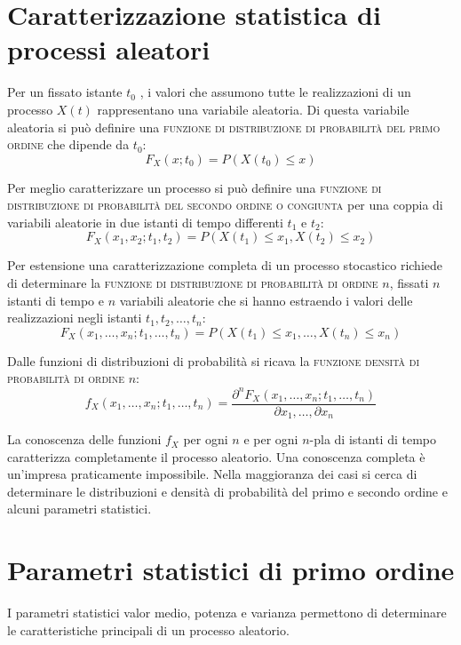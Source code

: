 \section{Caratterizzazione statistica di processi aleatori}
Per un fissato istante $t_0$ , i valori che assumono tutte le realizzazioni di un processo $X(t)$ rappresentano una variabile aleatoria. Di questa variabile aleatoria si può definire una \textsc{funzione di distribuzione di probabilità del primo ordine} che dipende da $t_0$:
\begin{equation}
F_X(x;t_0)=P(X(t_0)\leq x)
\end{equation}

Per meglio caratterizzare un processo si può definire una \textsc{funzione di distribuzione di probabilità del secondo ordine o congiunta} per una coppia di variabili aleatorie in due istanti di tempo differenti $t_1$ e $t_2$:
\begin{equation}
F_X(x_1,x_2;t_1,t_2)=P(X(t_1)\leq x_1,X(t_2)\leq x_2)
\end{equation}

Per estensione una caratterizzazione completa di un processo stocastico richiede di determinare la \textsc{funzione di distribuzione di probabilità di ordine $n$}, fissati $n$ istanti di tempo e $n$ variabili aleatorie che si hanno estraendo i valori delle realizzazioni negli istanti $t_1,t_2,\dots,t_n$:
\begin{equation}
F_X(x_1,\dots,x_n;t_1,\dots,t_n)=P(X(t_1)\leq x_1,\dots,X(t_n)\leq x_n)
\end{equation}

Dalle funzioni di distribuzioni di probabilità si ricava la \textsc{funzione densità di probabilità di ordine $n$}:
\begin{equation}
f_X(x_1,\dots,x_n;t_1,\dots,t_n)=\frac{\partial^n F_X(x_1,\dots,x_n;t_1,\dots,t_n)}{\partial x_1,\dots,\partial x_n}
\end{equation}

La conoscenza delle funzioni $f_X$ per ogni $n$ e per ogni $n$-pla di istanti di tempo caratterizza completamente il processo aleatorio. Una conoscenza completa è un'impresa praticamente impossibile. Nella maggioranza dei casi si cerca di determinare le distribuzioni e densità di probabilità del primo e secondo ordine e alcuni parametri statistici.

\section{Parametri statistici di primo ordine}
I parametri statistici valor medio, potenza e varianza permettono di determinare le caratteristiche principali di un processo aleatorio.

